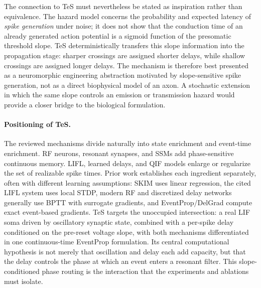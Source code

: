 The connection to TeS must nevertheless be stated as inspiration rather than equivalence. The hazard model concerns the probability and expected latency of \emph{spike generation} under noise; it does not show that the conduction time of an already generated action potential is a sigmoid function of the presomatic threshold slope. TeS deterministically transfers this slope information into the propagation stage: sharper crossings are assigned shorter delays, while shallow crossings are assigned longer delays. The mechanism is therefore best presented as a neuromorphic engineering abstraction motivated by slope-sensitive spike generation, not as a direct biophysical model of an axon. A stochastic extension in which the same slope controls an emission or transmission hazard would provide a closer bridge to the biological formulation.

\paragraph{Positioning of TeS.}
The reviewed mechanisms divide naturally into state enrichment and event-time enrichment. RF neurons, resonant synapses, and SSMs add phase-sensitive continuous memory. LIFL, learned delays, and QIF models enlarge or regularize the set of realizable spike times. Prior work establishes each ingredient separately, often with different learning assumptions: SKIM uses linear regression, the cited LIFL system uses local STDP, modern RF and discretized delay networks generally use BPTT with surrogate gradients, and EventProp/DelGrad compute exact event-based gradients. TeS targets the unoccupied intersection: a real LIF soma driven by oscillatory synaptic state, combined with a per-spike delay conditioned on the pre-reset voltage slope, with both mechanisms differentiated in one continuous-time EventProp formulation. Its central computational hypothesis is not merely that oscillation and delay each add capacity, but that the delay controls the phase at which an event enters a resonant filter. This slope-conditioned phase routing is the interaction that the experiments and ablations must isolate.
